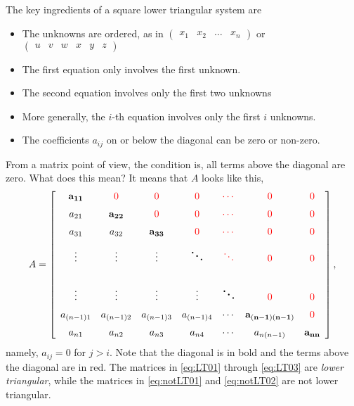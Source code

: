 \begin{tcolorbox}[sharp corners, colback=green!30, colframe=green!80!blue, title=\textbf{\large Triangular Matrices}]
The key ingredients of a square lower triangular system are 
\begin{itemize}
    \item The unknowns are ordered, as in $\begin{pmatrix} x_1 & x_2 & \ldots&  x_n \end{pmatrix}$ or $\begin{pmatrix} u & v & w & x & y & z \end{pmatrix}$
    \item The first equation only involves the first unknown.
    \item The second equation involves only the first two unknowns
    \item More generally, the $i$-th equation involves only the first $i$ unknowns.
    \item The coefficients $a_{ij}$ on or below the diagonal can be zero or non-zero. 
\end{itemize}
\end{tcolorbox}

From a matrix point of view, the condition is, all terms above the diagonal are zero. What does this mean? It means that $A$ looks like this, 
\begin{equation}
\label{eq:BigALowerTriangular}
A=\left[\begin{array}{ccccccc} {\bf a_{11}} & \RED  0&  \RED 0 & \RED 0 & \RED \cdots & \RED 0 &\RED 0 \medskip\\
a_{21} & {\bf a_{22}} & \RED 0 & \RED 0 & \RED \cdots & \RED 0 & \RED 0  \medskip\\ 
a_{31} & a_{32} & {\bf a_{33}} & \RED 0 & \RED \cdots & \RED 0 &   \medskip \RED 0\\
\vdots & \vdots & \vdots & {\boldsymbol \ddots}  & \RED\ddots &\RED 0 & \RED 0  \medskip\\
\\
\vdots & \vdots & \vdots & \vdots &  {\boldsymbol \ddots} &   \RED 0 & \RED 0  \medskip\\
a_{(n-1)1} & a_{(n-1)2} & a_{(n-1)3} & a_{(n-1)4} & \cdots & {\bf a_{(n-1)(n-1)} } & \RED 0 \medskip \\
a_{n1} & a_{n2} & a_{n3} & a_{n4} & \cdots & a_{n(n-1)} & {\bf a_{nn} } \end{array}\right],
\end{equation}
namely, $a_{ij} = 0$ for $j > i$. Note that the diagonal is in bold and the terms above the diagonal are in red. The matrices in \eqref{eq:LT01} through \eqref{eq:LT03} are \textit{lower triangular}, while the matrices in \eqref{eq:notLT01} and 
\eqref{eq:notLT02} are not lower triangular.

